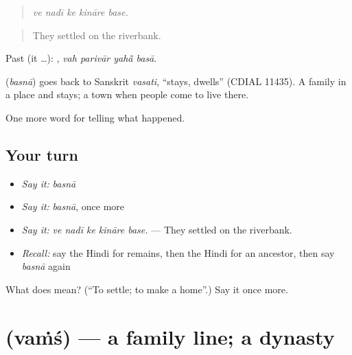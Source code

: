 \begin{quote}
    
\end{quote}

\begin{quote}
\emph{ve nadī ke kināre base.}
\end{quote}

\begin{quote}
They settled on the riverbank.
\end{quote}

Past (it …):    , \emph{vah parivār yahā̃ basā}.

\begin{cousinweb}
\textbf{} (\emph{basnā}) goes back to Sanskrit \emph{vasati}, \textquotedblleft{}stays, dwells\textquotedblright{} (CDIAL 11435). A family \textbf{ } in a place and stays; a town \textbf{ } when people come to live there.
\end{cousinweb}

\begin{grammarlens}[title={What you've built}]
One more word for telling what happened.
\end{grammarlens}

\subsection*{Your turn}
\begin{itemize}
\raggedright
  \item \emph{Say it:} \emph{basnā}
  \item \emph{Say it:} \emph{basnā}, once more
  \item \emph{Say it:} \emph{ve nadī ke kināre base.} — They settled on the riverbank.
  \item \emph{Recall:} say the Hindi for remains, then the Hindi for an ancestor, then say \emph{basnā} again
\end{itemize}

\begin{tcolorbox}[breakable,colback=teal!4,colframe=teal!35!black,title={Before you move on}]
What does  mean? (\textquotedblleft{}To settle; to make a home\textquotedblright{}.) Say it once more.
\end{tcolorbox}
\section[\texorpdfstring{\hi{वंश} (vaṁś)}{वंश (vaṁś)}]{ (vaṁś) — a family line; a dynasty}

